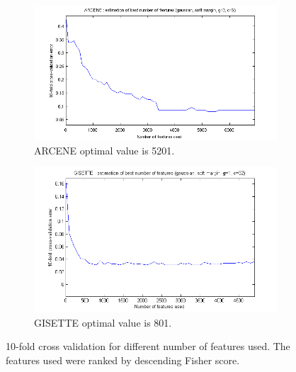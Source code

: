 \documentclass[12pt,a4paper,twocolumn]{article}
\begin{document}
\begin{figure}
	\center
	\begin{subfigure}[b]{0.55\textwidth}
	        \includegraphics[width=\textwidth]{img/10f-cv.png}
			\caption{{\footnotesize ARCENE optimal value is 5201.}}
			\label{fig:arcene_n}
	\end{subfigure}
	
	\begin{subfigure}[b]{0.55\textwidth}
           	\includegraphics[width=\textwidth]{img/gisette_no_features.png}
	           \caption{{\footnotesize GISETTE optimal value is 801}.}
	           \label{fig:gisette_n}
        \end{subfigure}

        \caption{{\footnotesize10-fold cross validation for different number of features used. The features used were ranked by descending Fisher score.}}
        \label{fig:no_features}
\end{figure}
\end{document}
